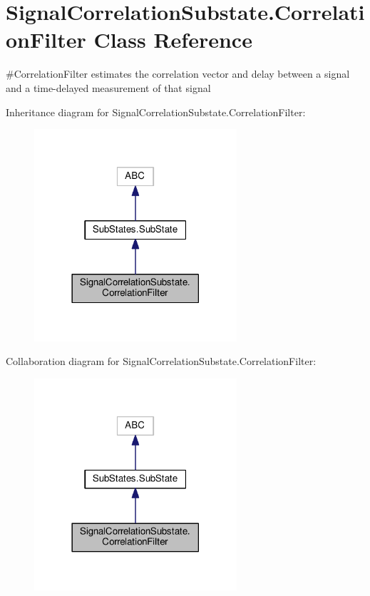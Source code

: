 \hypertarget{classSignalCorrelationSubstate_1_1CorrelationFilter}{}\section{Signal\+Correlation\+Substate.\+Correlation\+Filter Class Reference}
\label{classSignalCorrelationSubstate_1_1CorrelationFilter}


\#\+Correlation\+Filter estimates the correlation vector and delay between a signal and a time-\/delayed measurement of that signal  




Inheritance diagram for Signal\+Correlation\+Substate.\+Correlation\+Filter\+:\nopagebreak
\begin{figure}[H]
\begin{center}
\leavevmode
\includegraphics[width=213pt]{classSignalCorrelationSubstate_1_1CorrelationFilter__inherit__graph}
\end{center}
\end{figure}


Collaboration diagram for Signal\+Correlation\+Substate.\+Correlation\+Filter\+:\nopagebreak
\begin{figure}[H]
\begin{center}
\leavevmode
\includegraphics[width=213pt]{classSignalCorrelationSubstate_1_1CorrelationFilter__coll__graph}
\end{center}
\end{figure}
